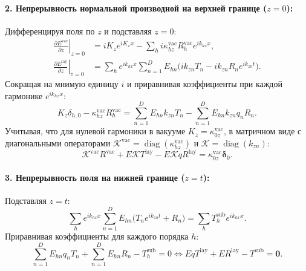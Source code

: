 \documentclass[a4paper,11pt]{article}
\begin{document}
\paragraph{2. Непрерывность нормальной производной на верхней границе ($z = 0$):}
Дифференцируя поля по $z$ и подставляя $z = 0$:
\begin{align}
    \left.\frac{\partial E^{\text{vac}}}{\partial z}\right|_{z=0} &= i K_z e^{i K_x x} - \sum_h i \kappa_{hz}^{\text{vac}} R_h^{\text{vac}} e^{i k_{hx} x}, \\
    \left.\frac{\partial E^{\text{lay}}}{\partial z}\right|_{z=0} &= \sum_h e^{i k_{hx} x} \sum_{n=1}^D E_{hn} \big( i k_{zn} T_n - i k_{zn} R_n e^{i k_{zn} t} \big).
\end{align}
Сокращая на мнимую единицу $i$ и приравнивая коэффициенты при каждой гармонике $e^{i k_{hx} x}$:
\begin{equation}
    K_z \delta_{h, 0} - \kappa_{hz}^{\text{vac}} R_h^{\text{vac}} = \sum_{n=1}^D E_{hn} k_{zn} T_n - \sum_{n=1}^D E_{hn} k_{zn} q_n R_n.
\end{equation}
Учитывая, что для нулевой гармоники в вакууме $K_z = \kappa_{0z}^{\text{vac}}$, в матричном виде с диагональными операторами $\mathcal{K}^{\text{vac}} = \operatorname{diag}(\kappa_{hz}^{\text{vac}})$ и $\mathcal{K} = \operatorname{diag}(k_{zn})$:
\begin{equation}
    \mathcal{K}^{\text{vac}} R^{\text{vac}} + E \mathcal{K} T^{\text{lay}} - E \mathcal{K} q R^{\text{lay}} = \kappa_{0z}^{\text{vac}} \boldsymbol{\delta}_0.
    \label{eq:bc_row2}
\end{equation}

\paragraph{3. Непрерывность поля на нижней границе ($z = t$):}
Подставляя $z = t$:
\begin{equation}
    \sum_h e^{i k_{hx} x} \sum_{n=1}^D E_{hn} \big( T_n e^{i k_{zn} t} + R_n \big) = \sum_h T_h^{\text{sub}} e^{i k_{hx} x}.
\end{equation}
Приравнивая коэффициенты для каждого порядка $h$:
\begin{equation}
    \sum_{n=1}^D E_{hn} q_n T_n + \sum_{n=1}^D E_{hn} R_n - T_h^{\text{sub}} = 0 \iff E q T^{\text{lay}} + E R^{\text{lay}} - T^{\text{sub}} = \mathbf{0}.
    \label{eq:bc_row3}
\end{equation}
\end{document}
